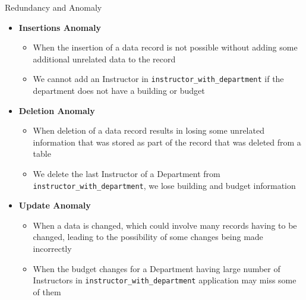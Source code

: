 \documentclass[aspectratio=169, xcolor=dvipsnames]{beamer}
\begin{document}
\begin{frame}{Redundancy and Anomaly}
    \begin{itemize}[<+->]
        \item \textbf{Insertions Anomaly}
        \begin{itemize}
            \item[$\triangleright$] When the insertion of a data record is not possible without adding some additional unrelated data to the record
            \item[$\triangleright$] We cannot add an Instructor in \texttt{instructor\_with\_department} if the department does not have a building or budget
        \end{itemize}
        \item \textbf{Deletion Anomaly}
        \begin{itemize}
            \item[$\triangleright$] When deletion of a data record results in losing some unrelated information that was stored as part of the record that was deleted from a table
            \item[$\triangleright$] We delete the last Instructor of a Department from \texttt{instructor\_with\_department}, we lose building and budget information
        \end{itemize}
        \item \textbf{Update Anomaly}
        \begin{itemize}
            \item[$\triangleright$] When a data is changed, which could involve many records having to be changed, leading to the possibility of some changes being made incorrectly
            \item[$\triangleright$] When the budget changes for a Department having large number of Instructors in \texttt{instructor\_with\_department} application may miss some of them
        \end{itemize}
    \end{itemize}
\end{frame}
\end{document}
